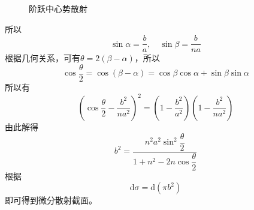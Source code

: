 \begin{solution}
\begin{figure}[htb]
\begin{asy}
\end{asy}
\caption{阶跃中心势散射}
\label{阶跃中心势散射}
\end{figure}
所以
\begin{equation*}
	\sin \alpha = \frac{b}{a},\quad \sin \beta = \frac{b}{na}
\end{equation*}
根据几何关系，可有$\theta=2(\beta-\alpha)$，所以
\begin{equation*}
	\cos \frac{\theta}{2} = \cos(\beta-\alpha) = \cos\beta \cos\alpha + \sin \beta \sin \alpha
\end{equation*}
所以有
\begin{equation*}
	\left(\cos \frac{\theta}{2}-\frac{b^2}{na^2}\right)^2 = \left(1-\frac{b^2}{a^2}\right)\left(1-\frac{b^2}{na^2}\right)
\end{equation*}
由此解得
\begin{equation*}
	b^2 = \frac{n^2a^2\sin^2 \dfrac{\theta}{2}}{1+n^2-2n\cos \dfrac{\theta}{2}}
\end{equation*}
根据
\begin{equation*}
	\mathrm{d} \sigma = \mathrm{d} (\pi b^2)%
\end{equation*}
即可得到微分散射截面。
\end{solution}
